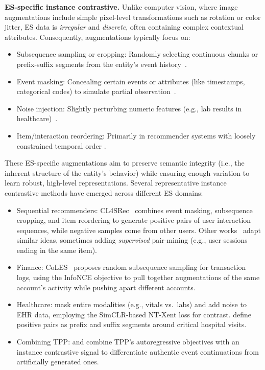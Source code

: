 \documentclass[twoside,11pt]{article}
\begin{document}
{\bf ES-specific instance contrastive.} Unlike computer vision, where image augmentations include simple pixel-level transformations such as rotation or color jitter, ES data is {\it irregular} and {\it discrete}, often containing complex contextual attributes. Consequently, augmentations typically focus on:
\begin{itemize}
\item Subsequence sampling or cropping: Randomly selecting continuous chunks or prefix-suffix segments from the entity’s event history~.

\item Event masking: Concealing certain events or attributes (like timestamps, categorical codes) to simulate partial observation~.

\item Noise injection: Slightly perturbing numeric features (e.g., lab results in healthcare)~.

\item Item/interaction reordering: Primarily in recommender systems with loosely constrained temporal order .
\end{itemize}
These ES-specific augmentations aim to preserve semantic integrity (i.e., the inherent structure of the entity’s behavior) while ensuring enough variation to learn robust, high-level representations.
Several representative instance contrastive methods have emerged across different ES domains:
\begin{itemize}
\item Sequential recommenders: CL4SRec~ combines event masking, subsequence cropping, and item reordering to generate positive pairs of user interaction sequences, while negative samples come from other users. Other works~ adapt similar ideas, sometimes adding \emph{supervised} pair-mining (e.g., user sessions ending in the same item).

\item Finance: CoLES~ proposes random subsequence sampling for transaction logs, using the InfoNCE objective to pull together augmentations of the same account’s activity while pushing apart different accounts.

\item Healthcare:  mask entire modalities (e.g., vitals vs.~labs) and add noise to EHR data, employing the SimCLR-based NT-Xent loss for contrast.  define positive pairs as prefix and suffix segments around critical hospital visits.

\item Combining TPP:  and  combine TPP's autoregressive objectives with an instance contrastive signal to differentiate authentic event continuations from artificially generated ones.
\end{itemize}
\end{document}
